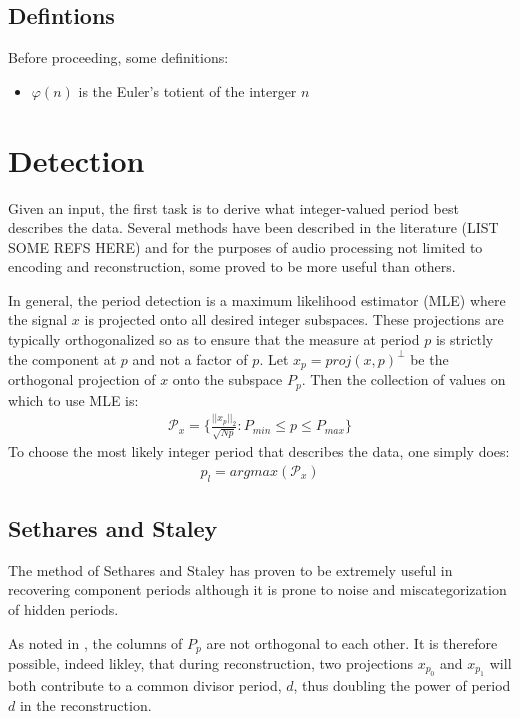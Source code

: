 \subsection{Defintions}
Before proceeding, some definitions:
\begin{itemize}
    \item $\varphi(n)$ is the Euler's totient of the interger $n$
\end{itemize}


\section{Detection}
Given an input, the first task is to derive what integer-valued period best describes the data. Several methods have been described in the literature (LIST SOME REFS HERE) and for the purposes of audio processing not limited to encoding and reconstruction, some proved to be more useful than others.

In general, the period detection is a maximum likelihood estimator (MLE) where the signal $x$ is projected onto all desired integer subspaces. These projections are typically orthogonalized so as to ensure that the measure at period $p$ is strictly the component at $p$ and not a factor of $p$. Let $x_p = proj(x, p)^{\perp}$ be the orthogonal projection of $x$ onto the subspace $P_p$. Then the collection of values on which to use MLE is:
\begin{align}
    \mathcal{P}_x = \bigg\{ \frac{||x_p||_2}{ \sqrt{Np} } : P_{min} \leq p \leq P_{max} \bigg\}
\end{align}
To choose the most likely integer period that describes the data, one simply does:
\begin{align}
    p_l = argmax(\mathcal{P}_x)
\end{align}

    \subsection{Sethares and Staley}
    The method of Sethares and Staley has proven to be extremely useful in recovering component periods although it is prone to noise and miscategorization of hidden periods.

    As noted in \cite{sethares1999periodicity}, the columns of $P_p$ are not orthogonal to each other. It is therefore possible, indeed likley, that during reconstruction, two projections $x_{p_0}$ and $x_{p_1}$ will both contribute to a common divisor period, $d$, thus doubling the power of period $d$ in the reconstruction.

